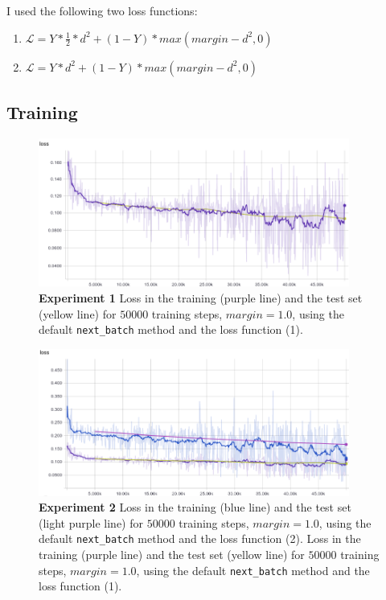 \documentclass{article}
\begin{document}
I used the following two loss functions:
\begin{enumerate}
\item $\mathcal{L} =  Y * \frac{1}{2} * d^2 + (1-Y) * max(margin - d^2, 0)$
\item $\mathcal{L} =  Y * d^2 + (1-Y) * max(margin - d^2, 0)$
\end{enumerate}


\subsection{Training}

\begin{figure}[h!]
\centering
\includegraphics[width=10.2cm]{siamese.png}
\caption{\textbf{Experiment 1} Loss in the training (purple line) and the test set (yellow line) for $50000$ training steps, $margin = 1.0$, using the default \texttt{next\_batch} method and the loss function (1).}
\label{fig:siamese}
\end{figure}



\begin{figure}[h!]
\centering
\includegraphics[width=10.2cm]{siamese-1.png}
\caption{\textbf{Experiment 2} Loss in the training (blue line) and the test set (light purple line) for $50000$ training steps, $margin = 1.0$, using the default \texttt{next\_batch} method and the loss function (2).
Loss in the training (purple line) and the test set (yellow line) for $50000$ training steps, $margin = 1.0$, using the default \texttt{next\_batch} method and the loss function (1).}
\label{fig:siamese-1}
\end{figure}
\end{document}
